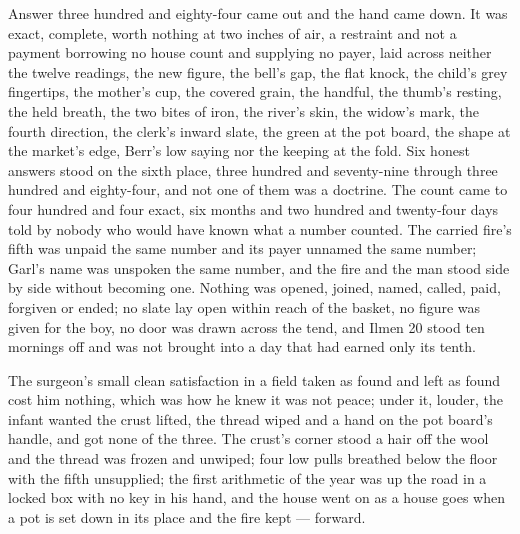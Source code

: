 Answer three hundred and eighty-four came out and the hand came down. It was exact, complete, worth nothing at two inches of air, a restraint and not a payment borrowing no house count and supplying no payer, laid across neither the twelve readings, the new figure, the bell's gap, the flat knock, the child's grey fingertips, the mother's cup, the covered grain, the handful, the thumb's resting, the held breath, the two bites of iron, the river's skin, the widow's mark, the fourth direction, the clerk's inward slate, the green at the pot board, the shape at the market's edge, Berr's low saying nor the keeping at the fold. Six honest answers stood on the sixth place, three hundred and seventy-nine through three hundred and eighty-four, and not one of them was a doctrine. The count came to four hundred and four exact, six months and two hundred and twenty-four days told by nobody who would have known what a number counted. The carried fire's fifth was unpaid the same number and its payer unnamed the same number; Garl's name was unspoken the same number, and the fire and the man stood side by side without becoming one. Nothing was opened, joined, named, called, paid, forgiven or ended; no slate lay open within reach of the basket, no figure was given for the boy, no door was drawn across the tend, and Ilmen 20 stood ten mornings off and was not brought into a day that had earned only its tenth.

The surgeon's small clean satisfaction in a field taken as found and left as found cost him nothing, which was how he knew it was not peace; under it, louder, the infant wanted the crust lifted, the thread wiped and a hand on the pot board's handle, and got none of the three. The crust's corner stood a hair off the wool and the thread was frozen and unwiped; four low pulls breathed below the floor with the fifth unsupplied; the first arithmetic of the year was up the road in a locked box with no key in his hand, and the house went on as a house goes when a pot is set down in its place and the fire kept --- forward.
